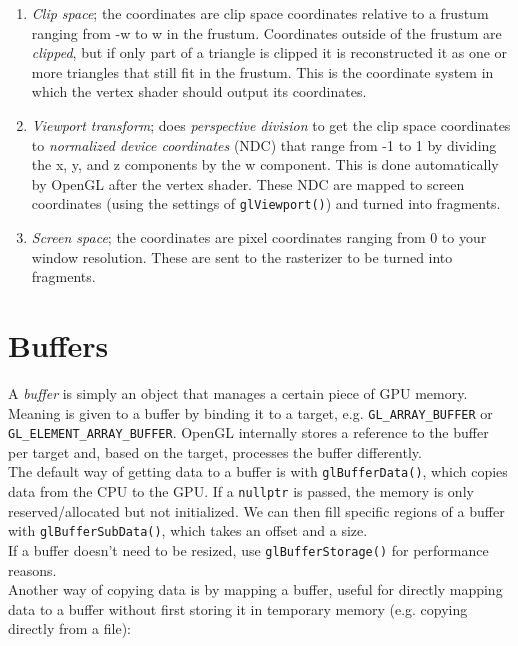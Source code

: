 \documentclass[table, xcdraw]{article}%
\begin{document}
\begin{enumerate}
\begin{itemize}
        \begin{verbatim}
        glm::mat4 proj = glm::perspective(glm::radians(fov), (float) resWidth / (float) resHeight, near, far);
        \end{verbatim}
    \end{itemize}
    \item \emph{Clip space}; the coordinates are clip space coordinates relative to a frustum ranging from -w to w in the frustum. Coordinates outside of the frustum are \emph{clipped}, but if only part of a triangle is clipped it is reconstructed it as one or more triangles that still fit in the frustum. This is the coordinate system in which the vertex shader should output its coordinates.
    \item[\large$\downarrow$] \emph{Viewport transform}; does \emph{perspective division} to get the clip space coordinates to \emph{normalized device coordinates} (NDC) that range from -1 to 1 by dividing the x, y, and z components by the w component. This is done automatically by OpenGL after the vertex shader. These NDC are mapped to screen coordinates (using the settings of \texttt{glViewport()}) and turned into fragments.
    \item \emph{Screen space}; the coordinates are pixel coordinates ranging from 0 to your window resolution. These are sent to the rasterizer to be turned into fragments.
\end{enumerate}

\section{Buffers}

A \emph{buffer} is simply an object that manages a certain piece of GPU memory. Meaning is given to a buffer by binding it to a target, e.g. \texttt{GL_ARRAY_BUFFER} or \texttt{GL_ELEMENT_ARRAY_BUFFER}. OpenGL internally stores a reference to the buffer per target and, based on the target, processes the buffer differently.\\
The default way of getting data to a buffer is with \texttt{glBufferData()}, which copies data from the CPU to the GPU. If a \texttt{nullptr} is passed, the memory is only reserved/allocated but not initialized. We can then fill specific regions of a buffer with \texttt{glBufferSubData()}, which takes an offset and a size.\\
If a buffer doesn't need to be resized, use \texttt{glBufferStorage()} for performance reasons.\\
Another way of copying data is by mapping a buffer, useful for directly mapping data to a buffer without first storing it in temporary memory (e.g. copying directly from a file):
\end{document}
